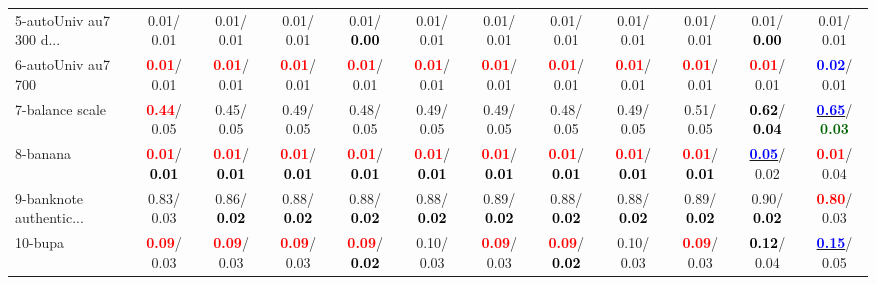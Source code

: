 \begin{table}[h]
\begin{center}
{\begin{tabular}{lc|c|c|c|c|c|c|c|c|c|c}
5-autoUniv au7 300 d... &   0.01/  0.01 &   0.01/  0.01 &   0.01/  0.01 &   0.01/\textcolor{black}{\textbf{  0.00}} &   0.01/  0.01 &   0.01/  0.01 &   0.01/  0.01 &   0.01/  0.01 &   0.01/  0.01 &   0.01/\textcolor{black}{\textbf{  0.00}} &   0.01/  0.01 \\
6-autoUniv au7 700 & \textcolor{red}{\textbf{  0.01}}/  0.01 & \textcolor{red}{\textbf{  0.01}}/  0.01 & \textcolor{red}{\textbf{  0.01}}/  0.01 & \textcolor{red}{\textbf{  0.01}}/  0.01 & \textcolor{red}{\textbf{  0.01}}/  0.01 & \textcolor{red}{\textbf{  0.01}}/  0.01 & \textcolor{red}{\textbf{  0.01}}/  0.01 & \textcolor{red}{\textbf{  0.01}}/  0.01 & \textcolor{red}{\textbf{  0.01}}/  0.01 & \textcolor{red}{\textbf{  0.01}}/  0.01 & \textcolor{blue}{\textbf{  0.02}}/  0.01 \\
7-balance scale & \textcolor{red}{\textbf{  0.44}}/  0.05 &   0.45/  0.05 &   0.49/  0.05 &   0.48/  0.05 &   0.49/  0.05 &   0.49/  0.05 &   0.48/  0.05 &   0.49/  0.05 &   0.51/  0.05 & \textcolor{black}{\textbf{  0.62}}/\textcolor{black}{\textbf{  0.04}} & \underline{\textcolor{blue}{\textbf{  0.65}}}/\textcolor{darkgreen}{\textbf{  0.03}} \\ \hline
8-banana & \textcolor{red}{\textbf{  0.01}}/\textcolor{black}{\textbf{  0.01}} & \textcolor{red}{\textbf{  0.01}}/\textcolor{black}{\textbf{  0.01}} & \textcolor{red}{\textbf{  0.01}}/\textcolor{black}{\textbf{  0.01}} & \textcolor{red}{\textbf{  0.01}}/\textcolor{black}{\textbf{  0.01}} & \textcolor{red}{\textbf{  0.01}}/\textcolor{black}{\textbf{  0.01}} & \textcolor{red}{\textbf{  0.01}}/\textcolor{black}{\textbf{  0.01}} & \textcolor{red}{\textbf{  0.01}}/\textcolor{black}{\textbf{  0.01}} & \textcolor{red}{\textbf{  0.01}}/\textcolor{black}{\textbf{  0.01}} & \textcolor{red}{\textbf{  0.01}}/\textcolor{black}{\textbf{  0.01}} & \underline{\textcolor{blue}{\textbf{  0.05}}}/  0.02 & \textcolor{red}{\textbf{  0.01}}/  0.04 \\
9-banknote authentic... &   0.83/  0.03 &   0.86/\textcolor{black}{\textbf{  0.02}} &   0.88/\textcolor{black}{\textbf{  0.02}} &   0.88/\textcolor{black}{\textbf{  0.02}} &   0.88/\textcolor{black}{\textbf{  0.02}} &   0.89/\textcolor{black}{\textbf{  0.02}} &   0.88/\textcolor{black}{\textbf{  0.02}} &   0.88/\textcolor{black}{\textbf{  0.02}} &   0.89/\textcolor{black}{\textbf{  0.02}} &   0.90/\textcolor{black}{\textbf{  0.02}} & \textcolor{red}{\textbf{  0.80}}/  0.03 \\
10-bupa & \textcolor{red}{\textbf{  0.09}}/  0.03 & \textcolor{red}{\textbf{  0.09}}/  0.03 & \textcolor{red}{\textbf{  0.09}}/  0.03 & \textcolor{red}{\textbf{  0.09}}/\textcolor{black}{\textbf{  0.02}} &   0.10/  0.03 & \textcolor{red}{\textbf{  0.09}}/  0.03 & \textcolor{red}{\textbf{  0.09}}/\textcolor{black}{\textbf{  0.02}} &   0.10/  0.03 & \textcolor{red}{\textbf{  0.09}}/  0.03 & \textcolor{black}{\textbf{  0.12}}/  0.04 & \underline{\textcolor{blue}{\textbf{  0.15}}}/  0.05 \\

\end{tabular}}
\end{center}
\end{table}
